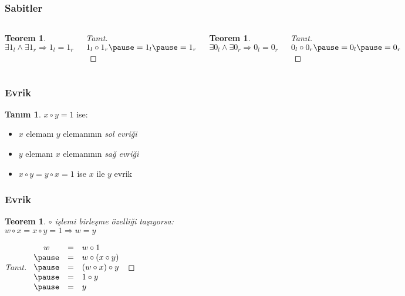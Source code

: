 \documentclass[dvipsnames]{beamer}
\theoremstyle{definition}
\newtheorem{tanim}[theorem]{Tanım}
\theoremstyle{example}
\theoremstyle{plain}
\newtheorem{teorem}[theorem]{Teorem}
\begin{document}
\begin{frame}
  \frametitle{Sabitler}

  \begin{columns}
    \begin{teorem}
      $\exists 1_l \wedge \exists 1_r \Rightarrow 1_l = 1_r$
    \end{teorem}

    \pause
    \begin{proof}[Tanıt]
      $1_l \circ 1_r \pause = 1_l \pause = 1_r$
    \end{proof}

    \pause
    \begin{teorem}
      $\exists 0_l \wedge \exists 0_r \Rightarrow 0_l = 0_r$
    \end{teorem}

    \pause
    \begin{proof}[Tanıt]
      $0_l \circ 0_r \pause = 0_l \pause = 0_r$
    \end{proof}
  \end{columns}
\end{frame}

\begin{frame}
  \frametitle{Evrik}

  \begin{tanim}
    $x \circ y = 1$ ise:

    \begin{itemize}
      \item $x$ elemanı $y$ elemanının \emph{sol evriği}
      \item $y$ elemanı $x$ elemanının \emph{sağ evriği}

      \pause
      \medskip
      \item $x \circ y = y \circ x = 1$ ise
        $x$ ile $y$ \alert{evrik}
    \end{itemize}
  \end{tanim}
\end{frame}

\begin{frame}
  \frametitle{Evrik}

  \begin{teorem}
    $\circ$ işlemi birleşme özelliği taşıyorsa:\\
    $w \circ x = x \circ y = 1 \Rightarrow w = y$
  \end{teorem}

  \pause
  \begin{proof}[Tanıt]
    $\begin{array}{ccl}
      w & = & w \circ 1\\ \pause
        & = & w \circ (x \circ y)\\ \pause
        & = & (w \circ x) \circ y\\ \pause
        & = & 1 \circ y\\ \pause
        & = & y
    \end{array}$
  \end{proof}
\end{frame}
\end{document}
